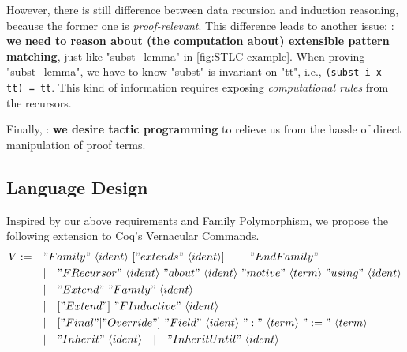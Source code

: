 However, there is still difference between data recursion and induction
reasoning, because the former one is \textit{proof-relevant}. This
difference leads to another issue: :
\textbf{we need to reason about (the computation about) extensible
pattern matching}, just like "subst_lemma" in \cref{fig:STLC-example}.
When proving "subst_lemma", we have to know "subst" is invariant on
"tt", i.e., \texttt{(subst i x tt) = tt}. This kind of
information requires exposing \textit{computational rules} from the
recursors.

Finally, : \textbf{we desire tactic
programming} to relieve us from the hassle of direct manipulation of proof terms.

\subsection{Language Design}
Inspired by our above requirements and Family Polymorphism, we propose
the following extension to Coq's Vernacular Commands.
\begin{align*}
  V := \quad &"Family"~\langle ident\rangle~["extends"~\langle ident\rangle] 
  \quad |\quad "EndFamily" \\
  & |\quad "FRecursor"~\langle ident\rangle~"about"~\langle ident\rangle~"motive"~\langle term\rangle~"using"~\langle ident\rangle \\
  & |\quad "Extend"~"Family"~\langle ident\rangle \\ 
  & |\quad ["Extend"]~"FInductive"~\langle ident\rangle \\ 
  & |\quad ["Final" | "Override"]~"Field"~\langle ident\rangle~":"~\langle term \rangle~":="~\langle term \rangle \\
  & | \quad "Inherit"~\langle ident\rangle \quad | \quad "Inherit Until"~\langle ident\rangle
\end{align*}

